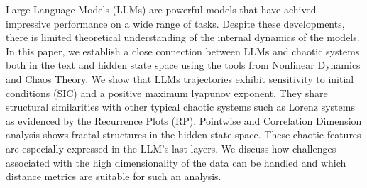 Large Language Models (LLMs) are powerful models that have achived impressive performance on a wide range of tasks.
Despite these developments, there is limited theoretical understanding of the internal dynamics of the models. In this paper, we establish a close connection between LLMs and chaotic systems both in the text and hidden state space using the tools from Nonlinear Dynamics and Chaos Theory. We show that LLMs 
trajectories exhibit sensitivity to initial conditions (SIC) and a positive maximum lyapunov exponent. They share structural similarities with other typical chaotic systems such as Lorenz systems as evidenced by the Recurrence Plots (RP). Pointwise and Correlation Dimension analysis shows fractal structures in the hidden state space. These chaotic features are especially expressed in the LLM's last layers. We discuss how challenges associated with the high dimensionality of the data can be handled and which distance metrics are suitable for such an analysis.







